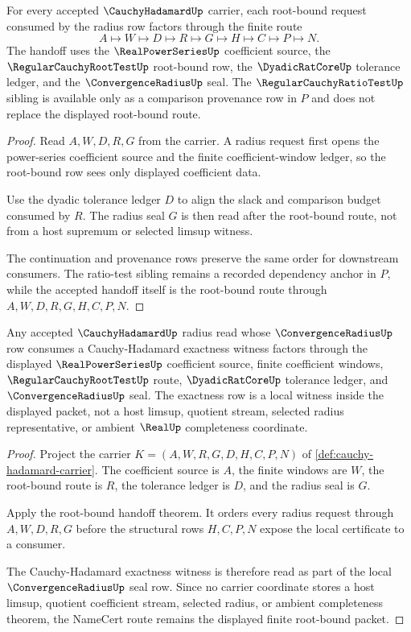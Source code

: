 \begin{theorem}
\label{thm:cauchy-hadamard-root-bound-handoff}
For every accepted $\CauchyHadamardUp$ carrier, each root-bound request consumed by the radius row factors through the finite route
$$
A\longmapsto W\longmapsto D\longmapsto R\longmapsto G\longmapsto H\longmapsto C\longmapsto P\longmapsto N.
$$
The handoff uses the $\RealPowerSeriesUp$ coefficient source, the $\RegularCauchyRootTestUp$ root-bound row, the $\DyadicRatCoreUp$ tolerance ledger, and the $\ConvergenceRadiusUp$ seal. The $\RegularCauchyRatioTestUp$ sibling is available only as a comparison provenance row in $P$ and does not replace the displayed root-bound route.
\end{theorem}
\begin{proof}
Read $A,W,D,R,G$ from the carrier. A radius request first opens the power-series coefficient source and the finite coefficient-window ledger, so the root-bound row sees only displayed coefficient data.

Use the dyadic tolerance ledger $D$ to align the slack and comparison budget consumed by $R$. The radius seal $G$ is then read after the root-bound route, not from a host supremum or selected limsup witness.

The continuation and provenance rows preserve the same order for downstream consumers. The ratio-test sibling remains a recorded dependency anchor in $P$, while the accepted handoff itself is the root-bound route through $A,W,D,R,G,H,C,P,N$.
\end{proof}

\begin{theorem}
\label{thm:cauchy-hadamard-root-bound-namecert}
Any accepted $\CauchyHadamardUp$ radius read whose $\ConvergenceRadiusUp$ row consumes a Cauchy-Hadamard exactness witness factors through the displayed $\RealPowerSeriesUp$ coefficient source, finite coefficient windows, $\RegularCauchyRootTestUp$ route, $\DyadicRatCoreUp$ tolerance ledger, and $\ConvergenceRadiusUp$ seal. The exactness row is a local witness inside the displayed packet, not a host limsup, quotient stream, selected radius representative, or ambient $\RealUp$ completeness coordinate.
\end{theorem}
\begin{proof}
Project the carrier $K=(A,W,R,G,D,H,C,P,N)$ of \autoref{def:cauchy-hadamard-carrier}. The coefficient source is $A$, the finite windows are $W$, the root-bound route is $R$, the tolerance ledger is $D$, and the radius seal is $G$.

Apply the root-bound handoff theorem. It orders every radius request through $A,W,D,R,G$ before the structural rows $H,C,P,N$ expose the local certificate to a consumer.

The Cauchy-Hadamard exactness witness is therefore read as part of the local $\ConvergenceRadiusUp$ seal row. Since no carrier coordinate stores a host limsup, quotient coefficient stream, selected radius, or ambient completeness theorem, the NameCert route remains the displayed finite root-bound packet.
\end{proof}

